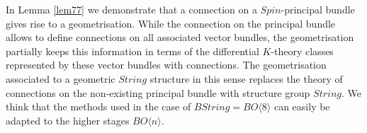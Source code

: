 \documentclass[12pt]{article}
\begin{document}

In Lemma \ref{lem77} we demonstrate that a connection on a $Spin$-principal bundle gives rise to a
geometrisation. While the connection on the principal bundle allows to define connections on all associated vector bundles, the geometrisation partially keeps this information in terms of the differential $K$-theory classes represented by these vector bundles with connections. 
The geometrisation associated to a geometric $String$ structure in this sense replaces the theory of
connections on the non-existing principal bundle with structure group $String$.
We think that the methods used in the case of $BString=BO\langle 8\rangle$ can easily be adapted to the higher stages $BO\langle n\rangle$.
\end{document}
